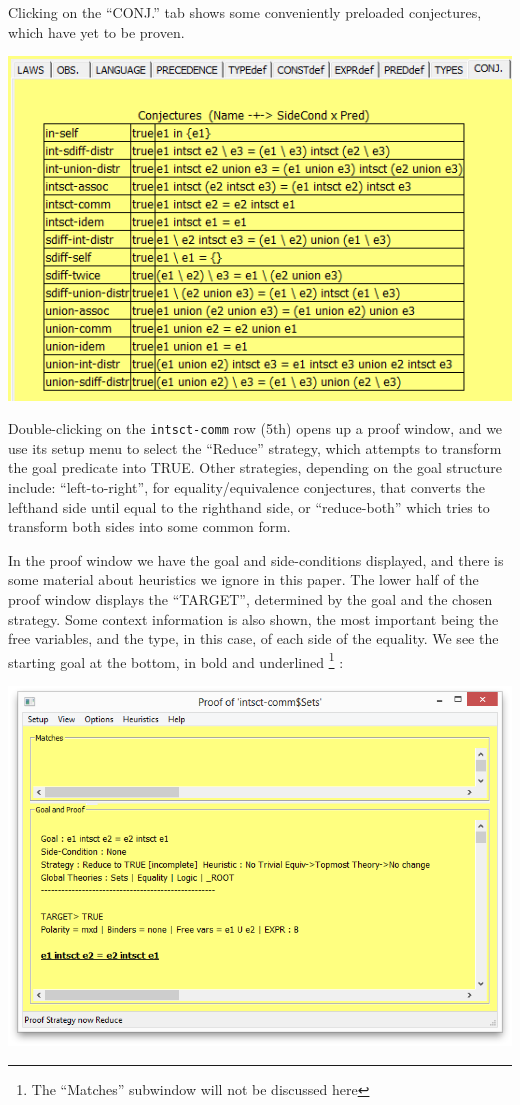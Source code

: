 \documentclass[copyright]{eptcs}
\begin{document}
\noindent
Clicking on the ``CONJ.'' tab shows some conveniently preloaded conjectures,
which have yet to be proven.

\includegraphics[scale=0.5]{03-set-conjectures.png}

\noindent
Double-clicking on the \texttt{intsct-comm} row (5th) opens up a proof window,
and we use its setup menu to select the ``Reduce'' strategy,
which attempts to transform the goal predicate into TRUE.
Other strategies, depending on the goal structure include: ``left-to-right'',
for equality/equivalence conjectures, that
converts the lefthand side until equal to the righthand side,
or ``reduce-both'' which tries to transform both sides into some common form.

In the proof window we have the goal and side-conditions displayed,
and there is some material about heuristics we ignore in this paper.
The lower half of the proof window displays the ``TARGET'',
determined by the goal and the chosen strategy.
Some context information is also shown, the most important being the free variables,
and the type, in this case, of each side of the equality.
We see the starting goal at the bottom, in bold and underlined%
\footnote{The ``Matches'' subwindow will not be discussed here}%
:

\includegraphics[scale=0.5]{06-starting-REDUCE-proof.png}
\end{document}
